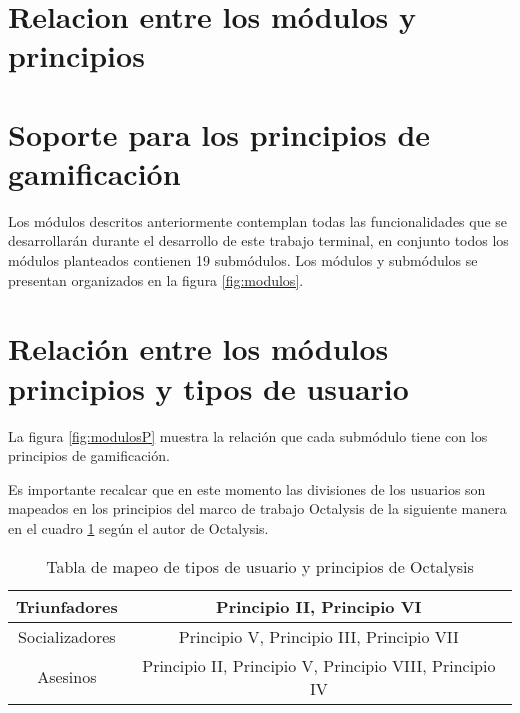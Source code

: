 
\section{Relacion entre los módulos y principios}
\section{Soporte para los principios de gamificación}

 Los módulos descritos anteriormente contemplan todas las funcionalidades que se desarrollarán
 durante el desarrollo de este trabajo terminal, en conjunto todos los módulos planteados contienen
 19 submódulos. Los módulos y submódulos se presentan organizados en la figura \ref{fig:modulos}.\\

 \noindent 

\section{Relación entre los módulos principios y tipos de usuario}
\label{analisis:principios}
    
    La figura \ref{fig:modulosP} muestra la relación que cada submódulo tiene con los principios de gamificación.
    

    Es importante recalcar que en este momento las divisiones de los usuarios son mapeados 
    en los principios del marco de trabajo Octalysis de la siguiente manera en el cuadro
    \ref{table:usuariosvprincipios} según el autor de Octalysis\cite[p. 414]{Octalysis}.
    
    \begin{table}[h!]
    \centering
    \begin{tabular}{|c|c|} \hline
        Triunfadores & Principio II, Principio VI \\ \hline
        Socializadores &  Principio V, Principio III, Principio VII\\\hline
        Asesinos & Principio II, Principio V, Principio VIII, Principio IV \\\hline
    \end{tabular}
    \caption{Tabla de mapeo de tipos de usuario y principios de Octalysis}
    \label{table:usuariosvprincipios}
    \end{table}
